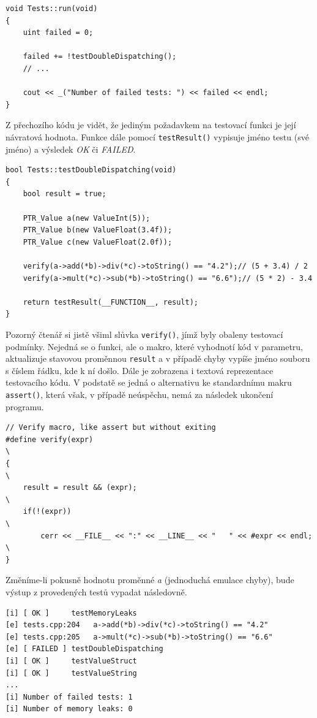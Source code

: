 \documentclass[11pt,twoside,a4paper]{book}
\begin{document}
\begin{verbatim}
void Tests::run(void)
{
    uint failed = 0;

    failed += !testDoubleDispatching();
    // ...

    cout << _("Number of failed tests: ") << failed << endl;
}
\end{verbatim}

Z přechozího kódu je vidět, že jediným požadavkem na testovací funkci je její návratová hodnota. Funkce dále pomocí \texttt{testResult()} vypisuje jméno testu (své jméno) a výsledek \textit{OK} či \textit{FAILED}.

\begin{verbatim}
bool Tests::testDoubleDispatching(void)
{
    bool result = true;

    PTR_Value a(new ValueInt(5));
    PTR_Value b(new ValueFloat(3.4f));
    PTR_Value c(new ValueFloat(2.0f));

    verify(a->add(*b)->div(*c)->toString() == "4.2");// (5 + 3.4) / 2
    verify(a->mult(*c)->sub(*b)->toString() == "6.6");// (5 * 2) - 3.4

    return testResult(__FUNCTION__, result);
}
\end{verbatim}

Pozorný čtenář si jistě všiml slůvka \texttt{verify()}, jímž byly obaleny testovací podmínky. Nejedná se o funkci, ale o makro, které vyhodnotí kód v parametru, aktualizuje stavovou proměnnou \texttt{result} a v případě chyby vypíše jméno souboru s číslem řádku, kde k ní došlo. Dále je zobrazena i textová reprezentace testovacího kódu. V podstatě se jedná o alternativu ke standardnímu makru \texttt{assert()}, která však, v případě neúspěchu, nemá za následek ukončení programu.

\begin{verbatim}
// Verify macro, like assert but without exiting
#define verify(expr)                                                   \
{                                                                      \
    result = result && (expr);                                         \
    if(!(expr))                                                        \
        cerr << __FILE__ << ":" << __LINE__ << "   " << #expr << endl; \
}
\end{verbatim}

Změníme-li pokusně hodnotu proměnné \textit{a} (jednoduchá emulace chyby), bude výstup z provedených testů vypadat ná\-sle\-dov\-ně.

\begin{verbatim}
[i] [ OK ]     testMemoryLeaks
[e] tests.cpp:204   a->add(*b)->div(*c)->toString() == "4.2"
[e] tests.cpp:205   a->mult(*c)->sub(*b)->toString() == "6.6"
[e] [ FAILED ] testDoubleDispatching
[i] [ OK ]     testValueStruct
[i] [ OK ]     testValueString
...
[i] Number of failed tests: 1
[i] Number of memory leaks: 0
\end{verbatim}
\end{document}
